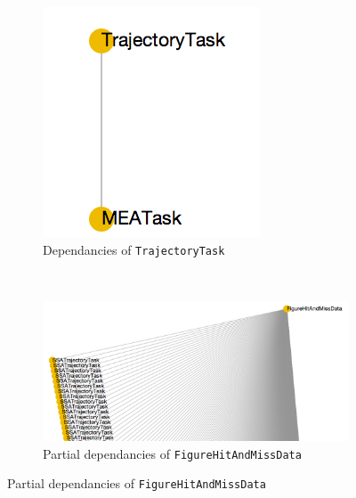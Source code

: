 \begin{figure}
    \centering
     \begin{subfigure}[t]{0.3\textwidth}
        \includegraphics[width=\textwidth]{images/TrajectoryTask.png}
        \caption{Dependancies of {\tt TrajectoryTask}}
        \label{fig:pipes_example:TrajectoryTask}
    \end{subfigure}
    ~
    \begin{subfigure}[t]{\textwidth}
        \includegraphics[width=\textwidth]{images/FigureHitAndMissData}
        \caption{Partial dependancies of {\tt FigureHitAndMissData}}
        \label{fig:pipes_example:FigureHitAndMissData}
    \end{subfigure}

\end{figure}
